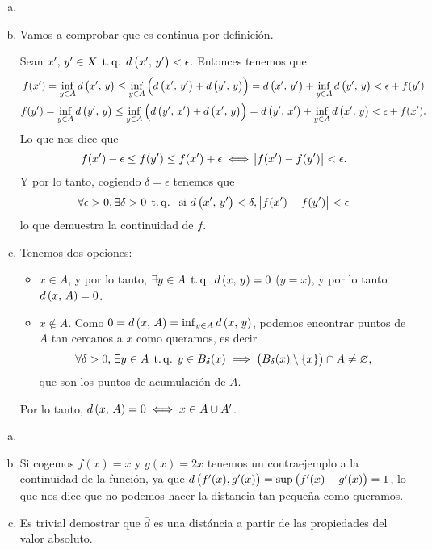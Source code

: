\begin{eje}
  \begin{enumerate}[(a)]
        \item[]
        \item
            Vamos a comprobar que es continua por definición. 
            
            Sean $x',\,y' \in X \operatorname{\;t.q.\;} d\left( x',\,y'\right) < \epsilon$. Entonces tenemos que
            \begin{gather*}
             f(x')= \inf_{y\in A} d\left( x',\,y\right) \leq \inf_{y\in A} \left( d\left( x',\,y'\right) + d\left( y',\,y\right) \right) = d\left( x',\,y'\right) + \inf_{y\in A} d\left( y',\,y\right) < \epsilon + f(y') \\
             f(y')= \inf_{y\in A} d\left( y',\,y\right) \leq \inf_{y\in A} \left( d\left( y',\,x'\right) + d\left( x',\,y\right) \right) = d\left( y',\,x'\right) + \inf_{y\in A} d\left( x',\,y\right) < \epsilon + f(x').
            \end{gather*}
            Lo que nos dice que 
            \[
             f(x')-\epsilon \leq f(y') \leq f(x') + \epsilon \iff \abs{f(x')-f(y')}< \epsilon .
            \]
            Y por lo tanto, cogiendo $\delta = \epsilon$ tenemos que 
            \[
             \forall \epsilon > 0, \exists \delta > 0 \operatorname{\;t.q.\;}  \text{ si }d\left( x',\,y'\right) < \delta,\, \abs{f(x')-f(y')} < \epsilon 
            \]
	    lo que demuestra la continuidad de $f$.
	\item
	  Tenemos dos opciones:
	  \begin{itemize}
	    \item $x \in A$, y por lo tanto, $\exists y \in A \operatorname{\;t.q.\;} d\left( x,\, y\right) = 0$ ($y=x$), y por lo tanto $d\left( x,\,A\right) =0$.
	    \item $x \not\in A$. Como $0=d\left( x,\, A\right) = \inf_{y \in A} d\left( x,\, y\right)$, podemos encontrar puntos de $A$ tan cercanos a $x$ como queramos, es decir
	    \[
	     \forall \delta >0 ,\,  \exists y \in A \operatorname{\;t.q.\;} y \in B_{\delta}(x) \implies \left( B_{\delta}(x)\setminus \{x\}\right) \cap A \neq \varnothing , 
	    \]
	    que son los puntos de acumulación de $A$.
	  \end{itemize}
	  Por lo tanto, $d\left( x,\,A\right) =0 \iff x \in A\cup A'$.
  \end{enumerate}
\end{eje}

\begin{eje}
  \begin{enumerate}[(a)]
   \item []
   \item Si cogemos $f(x)=x$ y $g(x)=2x$ tenemos un contraejemplo a la continuidad de la función, ya que $d\left( f'(x), g'(x) \right) = \sup \left( f'(x)-g'(x)\right) = 1$, lo que nos dice que no podemos hacer la distancia tan pequeña como queramos.
   \item Es trivial demostrar que $\bar{d}$ es una distáncia a partir de las propiedades del valor absoluto. 
  \end{enumerate}
\end{eje}
